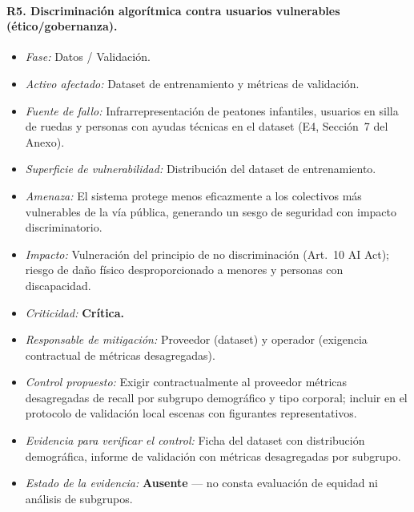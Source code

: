 \documentclass[11pt]{article}
\begin{document}
\paragraph{R5. Discriminación algorítmica contra usuarios vulnerables (ético/gobernanza).}
\begin{itemize}[nosep]
    \item \textit{Fase:} Datos / Validación.
    \item \textit{Activo afectado:} Dataset de entrenamiento y métricas de validación.
    \item \textit{Fuente de fallo:} Infrarrepresentación de peatones infantiles, usuarios en silla de ruedas y personas con ayudas técnicas en el dataset (E4, Sección~7 del Anexo).
    \item \textit{Superficie de vulnerabilidad:} Distribución del dataset de entrenamiento.
    \item \textit{Amenaza:} El sistema protege menos eficazmente a los colectivos más vulnerables de la vía pública, generando un sesgo de seguridad con impacto discriminatorio.
    \item \textit{Impacto:} Vulneración del principio de no discriminación (Art.~10 AI Act); riesgo de daño físico desproporcionado a menores y personas con discapacidad.
    \item \textit{Criticidad:} \textbf{Crítica.}
    \item \textit{Responsable de mitigación:} Proveedor (dataset) y operador (exigencia contractual de métricas desagregadas).
    \item \textit{Control propuesto:} Exigir contractualmente al proveedor métricas desagregadas de recall por subgrupo demográfico y tipo corporal; incluir en el protocolo de validación local escenas con figurantes representativos.
    \item \textit{Evidencia para verificar el control:} Ficha del dataset con distribución demográfica, informe de validación con métricas desagregadas por subgrupo.
    \item \textit{Estado de la evidencia:} \textbf{Ausente} --- no consta evaluación de equidad ni análisis de subgrupos.
\end{itemize}
\end{document}
